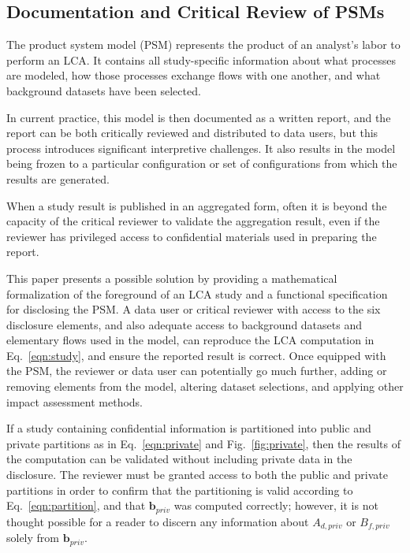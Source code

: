 \subsection{Documentation and Critical Review of PSMs}

The product system model (PSM) represents the product of an analyst's labor to perform an LCA.  It contains all study-specific information about what processes are modeled, how those processes exchange flows with one another, and what background datasets have been selected.

In current practice, this model is then documented as a written report, and the report can be both critically reviewed and distributed to data users, but this process introduces significant interpretive challenges.  It also results in the model being frozen to a particular configuration or set of configurations from which the results are generated.

When a study result is published in an aggregated form, often it is beyond the capacity of the critical reviewer to validate the aggregation result, even if the reviewer has privileged access to confidential materials used in preparing the report. 

This paper presents a possible solution by providing a mathematical formalization of the foreground of an LCA study and a functional specification for disclosing the PSM.  A data user or critical reviewer with access to the six disclosure elements, and also adequate access to background datasets and elementary flows used in the model, can reproduce the LCA computation in Eq.~\ref{eqn:study}, and ensure the reported result is correct.  Once equipped with the PSM, the reviewer or data user can potentially go much further, adding or removing elements from the model, altering dataset selections, and applying other impact assessment methods.


If a study containing confidential information is partitioned into public and private partitions as in Eq.~\ref{eqn:private} and Fig.~\ref{fig:private}, then the results of the computation can be validated without including private data in the disclosure.  The reviewer must be granted access to both the public and private partitions in order to confirm that the partitioning is valid according to Eq.~\ref{eqn:partition}, and that $\mathbf{b}_{priv}$ was computed correctly; however, it is not thought possible for a reader to discern any information about $A_{d,priv}$ or $B_{f,priv}$ solely from $\mathbf{b}_{priv}$.

